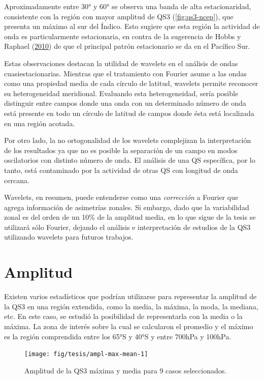 \documentclass[spanish,a4paper,12pt,oneside]{book}
\begin{document}
Aproximadamente entre 30° y 60° se observa una banda de alta
estacionaridad, consistente con la región con mayor amplitud de QS3
(\autoref{fig:qs3-ncep}), que presenta un máximo al sur del Índico. Esto
sugiere que esta región la actividad de onda es particularmente
estacionaria, en contra de la sugerencia de Hobbs y Raphael
(\protect\hyperlink{ref-Hobbs2010}{2010}) de que el principal patrón
estacionario se da en el Pacífico Sur.

Estas observaciones destacan la utilidad de wavelets en el análisis de
ondas cuasiestacionarias. Mientras que el tratamiento con Fourier asume
a las ondas como una propiedad media de cada círculo de latitud,
wavelets permite reconocer su heterogeneidad meridional. Evaluando esta
heterogeneidad, sería posible distinguir entre campos donde una onda con
un determinado número de onda está presente en todo un círculo de
latitud de campos donde ésta está localizada en una región acotada.

Por otro lado, la no ortogonalidad de los wavelets complejizan la
interpretación de los resultados ya que no es posible la separación de
un campo en modos oscilatorios con distinto número de onda. El análisis
de una QS específica, por lo tanto, está contaminado por la actividad de
otras QS con longitud de onda cercana.

Wavelets, en resumen, puede entenderse como una \emph{corrección} a
Fourier que agrega información de asimetrías zonales. Si embargo, dado
que la variabilidad zonal es del orden de un 10\% de la amplitud media,
en lo que sigue de la tesis se utilizará sólo Fourier, dejando el
análisis e interpretación de estudios de la QS3 utilizando wavelets para
futuros trabajos.

\section{Amplitud}\label{amplitud}

Existen varios estadísticos que podrían utilizarse para representar la
amplitud de la QS3 en una región extendida, como la media, la máxima, la
moda, la mediana, etc. En este caso, se estudió la posibilidad de
representarla con la media o la máxima. La zona de interés sobre la cual
se calcularon el promedio y el máximo es la región comprendida entre los
65°S y 40°S y entre 700hPa y 100hPa.

\begin{figure}
\texttt{[image: fig/tesis/ampl-max-mean-1]} \caption{Amplitud de la QS3 máxima y media para 9 casos seleccionados.}\label{fig:ampl-max-mean}
\end{figure}
\end{document}
